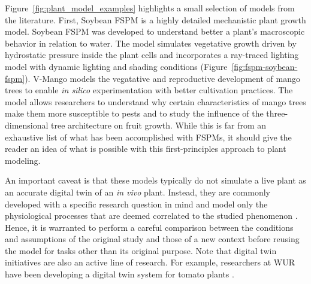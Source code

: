 \mbox{Figure \ref{fig:plant_model_examples}} highlights a small selection of models from the literature.
First, Soybean FSPM \citep{coussement_turgor-driven_2020} is a highly detailed mechanistic plant growth model. 
Soybean FSPM was developed to understand better a plant's macroscopic behavior in relation to water.
The model simulates vegetative growth driven by hydrostatic pressure inside the plant cells and incorporates a ray-traced lighting model with dynamic lighting and shading conditions \mbox{(Figure \ref{fig:fspm-soybean-fspm})}. 
V-Mango \citep{boudon_v-mango_2020} models the vegatative and reproductive development of mango trees to enable \textit{in silico} experimentation with better cultivation practices.
The model allows researchers to understand why certain characteristics of mango trees make them more susceptible to pests and to study the influence of the three-dimensional tree architecture on fruit growth.
While this is far from an exhaustive list of what has been accomplished with FSPMs, it should give the reader an idea of what is possible with this first-principles approach to plant modeling.




An important caveat is that these models typically do not simulate a live plant as an accurate digital twin of an \textit{in vivo} plant.
Instead, they are commonly developed with a specific research question in mind and model only the physiological processes that are deemed correlated to the studied phenomenon \citep{louarn_two_2020}.
Hence, it is warranted to perform a careful comparison between the conditions and assumptions of the original study and those of a new context before reusing the model for tasks other than its original purpose.
Note that digital twin initiatives are also an active line of research. For example, researchers at WUR have been developing a digital twin system for tomato plants \citep{npec_wur_2020}.
